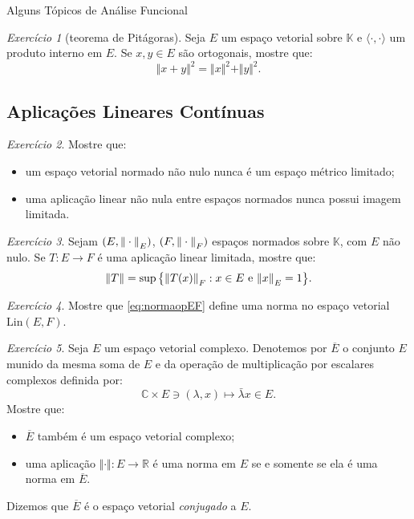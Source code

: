 \documentclass[oneside,final,11pt]{amsbook}
\newcommand{\R}{\mathds R}
\newcommand{\C}{\mathds C}
\newcommand{\K}{\mathds K}
\newcommand{\Lin}{\mathrm{Lin}}
\newcommand{\norma}[2]{\Vert#1\Vert_{\lower2pt\hbox{$\scriptstyle#2$}}}
\theoremstyle{remark}\newtheorem{exercise}{Exercício}[chapter]
\theoremstyle{remark}\newtheorem{*exercise}[exercise]{\hbox to 0pt{\hskip 0pt minus 1fil*}Exercício}
\theoremstyle{definition}\newtheorem{exdefin}{Definição}[chapter]
\theoremstyle{plain}\newtheorem{teo}{Teorema}[section]
\theoremstyle{plain}\newtheorem{lem}[teo]{Lema}
\theoremstyle{plain}\newtheorem{prop}[teo]{Proposição}
\theoremstyle{plain}\newtheorem{cor}[teo]{Corolário}
\theoremstyle{definition}\newtheorem{defin}[teo]{Definição}
\theoremstyle{remark}\newtheorem{rem}[teo]{Observação}
\theoremstyle{definition}\newtheorem{notation}[teo]{Notação}
\theoremstyle{definition}\newtheorem{convention}[teo]{Convenção}
\theoremstyle{definition}\newtheorem{example}[teo]{Exemplo}
\numberwithin{section}{chapter}
\numberwithin{equation}{section}
\begin{document}
\begin{chapter}{Alguns Tópicos de Análise Funcional}
\begin{exercise}[teorema de Pitágoras]
\label{exe:pitagoras}
Seja $E$ um espaço vetorial sobre $\K$ e $\langle\cdot,\cdot\rangle$ um produto interno em $E$.
Se $x,y\in E$ são ortogonais, mostre que:
\[\Vert x+y\Vert^2=\Vert x\Vert^2+\Vert y\Vert^2.\]
\end{exercise}

\subsection*{Aplicações Lineares Contínuas}

\begin{exercise}\label{exe:limitadamesmo}
Mostre que:
\begin{itemize}
\item um espaço vetorial normado não nulo nunca é um espaço métrico limitado;
\item uma aplicação linear não nula entre espaços normados nunca possui imagem limitada.
\end{itemize}
\end{exercise}

\begin{exercise}\label{exe:supnaesfera}
Sejam $(E,\norma\cdot E)$, $(F,\norma\cdot F)$ espaços normados sobre $\K$,
com $E$ não nulo. Se $T:E\to F$ é uma aplicação linear limitada, mostre que:
\[\Vert T\Vert=\sup\big\{\norma{T(x)}F:\text{$x\in E$ e $\norma xE=1$}\big\}.\]
\end{exercise}

\begin{exercise}\label{exe:normaop}
Mostre que \eqref{eq:normaopEF} define uma norma no espaço vetorial $\Lin(E,F)$.
\end{exercise}

\begin{exercise}\label{exe:espconjugado1}
Seja $E$ um espaço vetorial complexo. Denotemos por $\overline E$ o conjunto $E$
munido da mesma soma de $E$ e da operação de multiplicação por escalares complexos
definida por:
\[\C\times E\ni(\lambda,x)\longmapsto\bar\lambda x\in E.\]
Mostre que:
\begin{itemize}
\item $\overline E$ também é um espaço vetorial complexo;
\item uma aplicação $\Vert\cdot\Vert:E\to\R$ é uma norma em $E$ se e somente se ela é uma norma
em $\overline E$.
\end{itemize}
Dizemos que $\overline E$ é o espaço vetorial
{\em conjugado\/}%
 a $E$.
\end{exercise}


\end{chapter}
\end{document}
